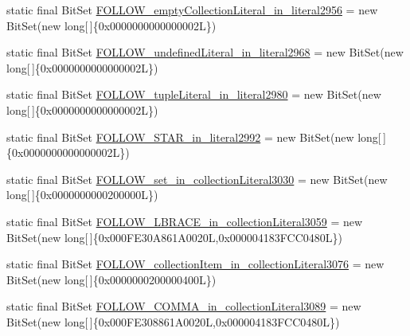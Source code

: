 \begin{DoxyCompactItemize}
\item 
static final Bit\-Set \hyperlink{classorg_1_1tzi_1_1use_1_1parser_1_1testsuite_1_1_test_suite_parser_a61805e637d2230643b449a5bcdf05784}{F\-O\-L\-L\-O\-W\-\_\-empty\-Collection\-Literal\-\_\-in\-\_\-literal2956} = new Bit\-Set(new long\mbox{[}$\,$\mbox{]}\{0x0000000000000002\-L\})
\item 
static final Bit\-Set \hyperlink{classorg_1_1tzi_1_1use_1_1parser_1_1testsuite_1_1_test_suite_parser_ad45a34072da8796aaa62acc99b3e1123}{F\-O\-L\-L\-O\-W\-\_\-undefined\-Literal\-\_\-in\-\_\-literal2968} = new Bit\-Set(new long\mbox{[}$\,$\mbox{]}\{0x0000000000000002\-L\})
\item 
static final Bit\-Set \hyperlink{classorg_1_1tzi_1_1use_1_1parser_1_1testsuite_1_1_test_suite_parser_aa82589e90c333867d64bcc87d6526380}{F\-O\-L\-L\-O\-W\-\_\-tuple\-Literal\-\_\-in\-\_\-literal2980} = new Bit\-Set(new long\mbox{[}$\,$\mbox{]}\{0x0000000000000002\-L\})
\item 
static final Bit\-Set \hyperlink{classorg_1_1tzi_1_1use_1_1parser_1_1testsuite_1_1_test_suite_parser_a849ad41125c8737c213193737d56d879}{F\-O\-L\-L\-O\-W\-\_\-\-S\-T\-A\-R\-\_\-in\-\_\-literal2992} = new Bit\-Set(new long\mbox{[}$\,$\mbox{]}\{0x0000000000000002\-L\})
\item 
static final Bit\-Set \hyperlink{classorg_1_1tzi_1_1use_1_1parser_1_1testsuite_1_1_test_suite_parser_a12e4806169ea03975689971b4de08008}{F\-O\-L\-L\-O\-W\-\_\-set\-\_\-in\-\_\-collection\-Literal3030} = new Bit\-Set(new long\mbox{[}$\,$\mbox{]}\{0x0000000000200000\-L\})
\item 
static final Bit\-Set \hyperlink{classorg_1_1tzi_1_1use_1_1parser_1_1testsuite_1_1_test_suite_parser_a2a7bf430ccfdb7a49098827b82f0e66e}{F\-O\-L\-L\-O\-W\-\_\-\-L\-B\-R\-A\-C\-E\-\_\-in\-\_\-collection\-Literal3059} = new Bit\-Set(new long\mbox{[}$\,$\mbox{]}\{0x000\-F\-E30\-A861\-A0020\-L,0x000004183\-F\-C\-C0480\-L\})
\item 
static final Bit\-Set \hyperlink{classorg_1_1tzi_1_1use_1_1parser_1_1testsuite_1_1_test_suite_parser_a9ef8856edfe760f882e93ede5d675355}{F\-O\-L\-L\-O\-W\-\_\-collection\-Item\-\_\-in\-\_\-collection\-Literal3076} = new Bit\-Set(new long\mbox{[}$\,$\mbox{]}\{0x0000000200000400\-L\})
\item 
static final Bit\-Set \hyperlink{classorg_1_1tzi_1_1use_1_1parser_1_1testsuite_1_1_test_suite_parser_add1f1e7f79445d6394b3e4195eb078a3}{F\-O\-L\-L\-O\-W\-\_\-\-C\-O\-M\-M\-A\-\_\-in\-\_\-collection\-Literal3089} = new Bit\-Set(new long\mbox{[}$\,$\mbox{]}\{0x000\-F\-E308861\-A0020\-L,0x000004183\-F\-C\-C0480\-L\})

\end{DoxyCompactItemize}
